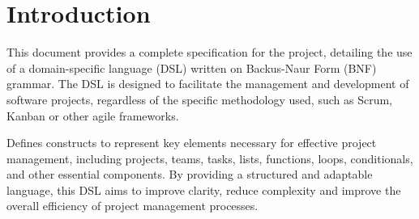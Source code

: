 \section{Introduction}
\label{sec:introduction}
This document provides a complete specification for the project, detailing the use of a domain-specific language (DSL) written on Backus-Naur Form (BNF) grammar. The DSL is designed to facilitate the management and development of software projects, regardless of the specific methodology used, such as Scrum, Kanban or other agile frameworks.

Defines constructs to represent key elements necessary for effective project management, including projects, teams, tasks, lists, functions, loops, conditionals, and other essential components. By providing a structured and adaptable language, this DSL aims to improve clarity, reduce complexity and improve the overall efficiency of project management processes.

